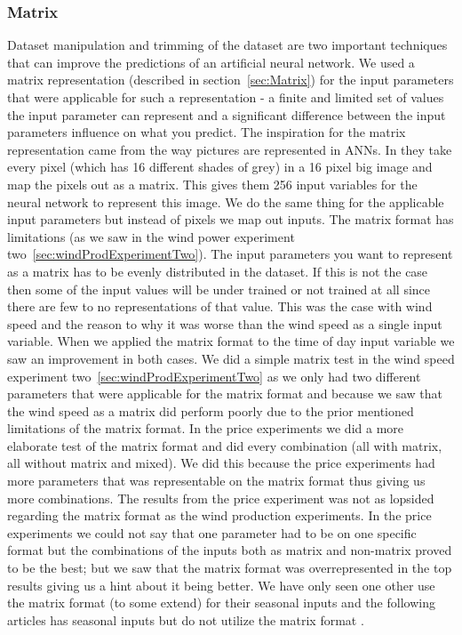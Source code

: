 \subsubsection{Matrix}
Dataset manipulation and trimming of the dataset are two important techniques that can improve the predictions of an artificial neural network. We used a matrix representation (described in section~\ref{sec:Matrix}) for the input parameters that were applicable for such a representation - a finite and limited set of values the input parameter can represent and a significant difference between the input parameters influence on what you predict. The inspiration for the matrix representation came from the way pictures are represented in ANNs. In \cite{knerr1992handwritten} they take every pixel (which has 16 different shades of grey) in a 16 pixel big image and map the pixels out as a matrix. This gives them 256 input variables for the neural network to represent this image. We do the same thing for the applicable input parameters but instead of pixels we map out inputs. The matrix format has limitations (as we saw in the wind power experiment two~\ref{sec:windProdExperimentTwo}). The input parameters you want to represent as a matrix has to be evenly distributed in the dataset. If this is not the case then some of the input values will be under trained or not trained at all since there are few to no representations of that value. This was the case with wind speed and the reason to why it was worse than the wind speed as a single input variable. When we applied the matrix format to the time of day input variable we saw an improvement in both cases. We did a simple matrix test in the wind speed experiment two~\ref{sec:windProdExperimentTwo} as we only had two different parameters that were applicable for the matrix format and because we saw that the wind speed as a matrix did perform poorly due to the prior mentioned limitations of the matrix format. In the price experiments we did a more elaborate test of the matrix format and did every combination (all with matrix, all without matrix and mixed). We did this because the price experiments had more parameters that was representable on the matrix format thus giving us more combinations. The results from the price experiment was not as lopsided regarding the matrix format as the wind production experiments. In the price experiments we could not say that one parameter had to be on one specific format but the combinations of the inputs both as matrix and non-matrix proved to be the best; but we saw that the matrix format was overrepresented in the top results giving us a hint about it being better. We have only seen one other \cite{crowley2005weather} use the matrix format (to some extend) for their seasonal inputs and the following articles has seasonal inputs but do not utilize the matrix format \cite{szkuta1999electricity, singhal2011electricity}.

